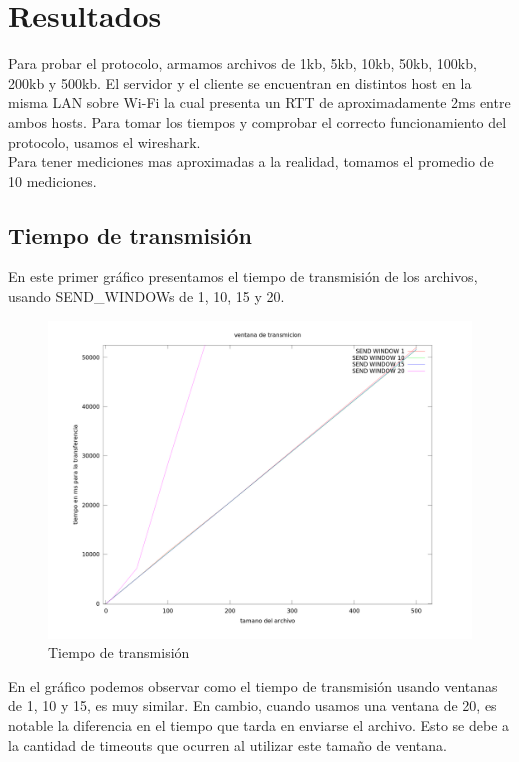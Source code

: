 \newpage
\section{Resultados}
\indent Para probar el protocolo, armamos archivos de 1kb, 5kb, 10kb, 50kb, 100kb, 200kb y
500kb. El servidor y el cliente se encuentran en distintos host en la misma LAN sobre Wi-Fi la cual presenta un RTT de aproximadamente 2ms entre ambos hosts. Para
tomar los tiempos y comprobar el correcto funcionamiento del protocolo, usamos
el wireshark.\\
\indent Para tener mediciones mas aproximadas a la realidad, tomamos el promedio de 10 mediciones.\\

\subsection{Tiempo de transmisión}
\indent En este primer gráfico presentamos el tiempo de transmisión de los archivos, usando SEND\_WINDOWs de 1, 10, 15 y 20.

\begin{figure}[h]
  \centering                                                       
          \includegraphics[width=500pt]{./datos/graf.png}
          \caption{Tiempo de transmisión}
          \label{fig:tt}
\end{figure}

\clearpage
\indent En el gráfico podemos observar como el tiempo de transmisión usando
ventanas de 1, 10 y 15, es muy similar. En cambio, cuando usamos una ventana de
20, es notable la diferencia en el tiempo que tarda en enviarse el
archivo. Esto se debe a la cantidad de timeouts que ocurren al utilizar este tamaño de ventana.\\

